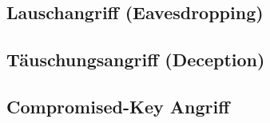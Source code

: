 \subsection{Lauschangriff (Eavesdropping)}\label{subsec:lauschen} %

\subsection{T\"auschungsangriff (Deception)}\label{subsec:tauschung} %




\subsection{Compromised-Key Angriff}\label{subsec:key}
